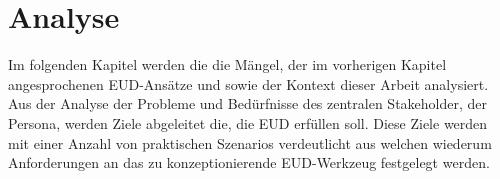 \chapter{Analyse}\label{chapter:analyse}
Im folgenden Kapitel werden die  die Mängel, der im vorherigen Kapitel angesprochenen \ac{EUD}-Ansätze und sowie der Kontext dieser Arbeit analysiert. Aus der Analyse der Probleme und Bedürfnisse des zentralen Stakeholder, der Persona, werden Ziele abgeleitet die, die \ac{EUD} erfüllen soll. Diese Ziele werden mit einer Anzahl von praktischen Szenarios verdeutlicht aus welchen wiederum Anforderungen an das zu konzeptionierende \ac{EUD}-Werkzeug festgelegt werden.  





